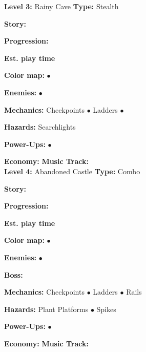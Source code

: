 \documentclass[12pt]{article}
\begin{document}
\begin{multicols}{2}
\noindent \textbf{Level 3:} Rainy Cave \newline
\indent \textbf{Type:} Stealth
\begin{addmargin}[5mm]{0em}
\textbf{Story:} 
\end{addmargin}
\begin{addmargin}[5mm]{0em}
\textbf{Progression:} 
\end{addmargin}
\indent\indent \textbf{Est. play time}
\begin{addmargin}[5mm]{0em}
\textbf{Color map:} $\bullet$
\end{addmargin}
\begin{addmargin}[5mm]{0em}
\textbf{Enemies:} $\bullet$
\end{addmargin}
\begin{addmargin}[5mm]{0em}
\textbf{Mechanics:} Checkpoints $\bullet$ Ladders $\bullet$
\end{addmargin}
\begin{addmargin}[5mm]{0em}
\textbf{Hazards:} Searchlights
\end{addmargin}
\begin{addmargin}[5mm]{0em}
\textbf{Power-Ups:} $\bullet$
\end{addmargin}
\indent\indent \textbf{Economy:}  \newline
\indent \textbf{Music Track:} 
\\
\columnbreak
\noindent \textbf{Level 4:} Abandoned Castle \newline
\indent \textbf{Type:} Combo
\begin{addmargin}[5mm]{0em}
\textbf{Story:} 
\end{addmargin}
\begin{addmargin}[5mm]{0em}
\textbf{Progression:} 
\end{addmargin}
\indent\indent \textbf{Est. play time}
\begin{addmargin}[5mm]{0em}
\textbf{Color map:} $\bullet$
\end{addmargin}
\begin{addmargin}[5mm]{0em}
\textbf{Enemies:} $\bullet$
\end{addmargin}
\begin{addmargin}[5mm]{0em}
\textbf{Boss:} \\ %
\end{addmargin}
\begin{addmargin}[5mm]{0em}
\textbf{Mechanics:} Checkpoints $\bullet$ Ladders $\bullet$ Rails
\end{addmargin}
\begin{addmargin}[5mm]{0em}
\textbf{Hazards:} Plant Platforms $\bullet$ Spikes
\end{addmargin}
\begin{addmargin}[5mm]{0em}
\textbf{Power-Ups:} $\bullet$
\end{addmargin}
\indent\indent \textbf{Economy:}  \newline
\indent \textbf{Music Track:} 
\end{multicols}
\newpage
\end{document}
